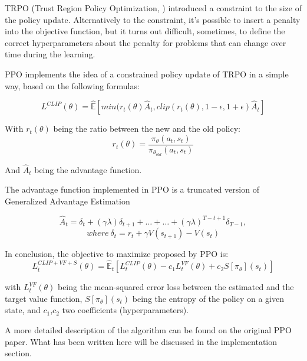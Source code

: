 \documentclass{article}
\begin{document}
TRPO (Trust Region Policy Optimization, \citet{DBLP:journals/corr/SchulmanLMJA15}) introduced a constraint to the size of the policy update. Alternatively to the constraint, it's possible to insert a penalty into the objective function, but it turns out difficult, sometimes, to define the correct hyperparameters about the penalty for problems that can change over time during the learning.

PPO implements the idea of a constrained policy update of TRPO in a simple way, based on the following formulas:

\begin{displaymath}
L^{CLIP}(\theta) = \hat{\mathbb{E}}[min(r_t (\theta)\hat{A}_t, clip(r_t(\theta), 1-\epsilon, 1+\epsilon)\hat{A}_t]
\end{displaymath}

With \(r_t(\theta)\) being the ratio between the new and the old policy:
\begin{displaymath}
r_t(\theta) = \frac{\pi_\theta(a_t,s_t)}{\pi_{\theta_{old}}(a_t,s_t)}
\end{displaymath}

And \(\hat{A}_t\) being the advantage function.

The advantage function implemented in PPO is a truncated version of Generalized Advantage Estimation \citep{schulman2018highdimensional}

\begin{displaymath}
\hat{A}_t = \delta_t + (\gamma\lambda)\delta_{t+1} + \dots + \dots + (\gamma\lambda)^{T-t+1} \delta_{T-1},
\end{displaymath}
\begin{displaymath}
{where\ }\delta_t = r_t + \gamma V(s_{t+1}) - V(s_t)
\end{displaymath}

In conclusion, the objective to maximize proposed by PPO is:
\begin{displaymath}
L_t^{CLIP+VF+S}(\theta) = \hat{\mathbb{E}}_t [L_t^{CLIP}(\theta) - c_1 L_t^{VF}(\theta) +c_2S[\pi_\theta](s_t)]
\end{displaymath}

with \(L_t^{VF}(\theta)\) being the mean-squared error loss between the estimated and the target value function, \(S[\pi_\theta](s_t)\) being the entropy of the policy on a given state, and \(c_1\),\(c_2\) two coefficients (hyperparameters).

A more detailed description of the algorithm can be found on the original PPO paper. What has been written here will be discussed in the implementation section.
\end{document}
